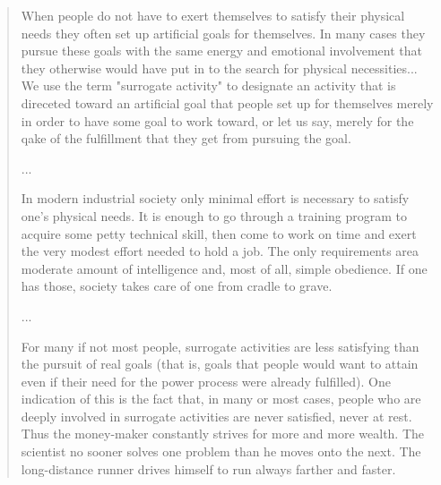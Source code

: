 \begin{quote}
When people do not have to exert themselves to satisfy their physical needs they often set up artificial goals for themselves. In many cases they pursue these goals with the same energy and emotional involvement that they otherwise would have put in to the search for physical necessities... We use the term "surrogate activity" to designate an activity that is direceted toward an artificial goal that people set up for themselves merely in order to have some goal to work toward, or let us say, merely for the qake of the fulfillment that they get from pursuing the goal.

...

In modern industrial society only minimal effort is necessary to satisfy one's physical needs. It is enough to go through a training program to acquire some petty technical skill, then come to work on time and exert the very modest effort needed to hold a job. The only requirements area moderate amount of intelligence and, most of all, simple obedience. If one has those, society takes care of one from cradle to grave.

...

For many if not most people, surrogate activities are less satisfying than the pursuit of real goals (that is, goals that people would want to attain even if their need for the power process were already fulfilled). One indication of this is the fact that, in many or most cases, people who are deeply involved in surrogate activities are never satisfied, never at rest. Thus the money-maker constantly strives for more and more wealth. The scientist no sooner solves one problem than he moves onto the next. The long-distance runner drives himself to run always farther and faster.
\end{quote}